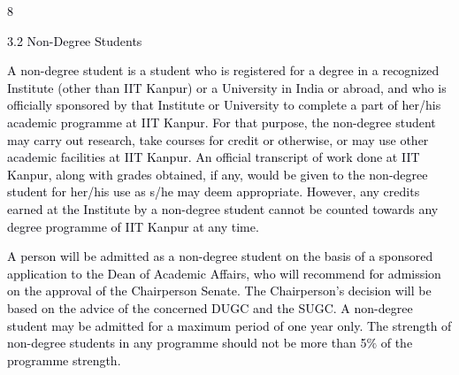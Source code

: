 \documentclass[12pt]{article}
\begin{document}
\vspace{\baselineskip}

\vspace{\baselineskip}

\vspace{\baselineskip}

\vspace{\baselineskip}
\begin{Center}
\textcolor[HTML]{00000A}{8}
\end{Center}\par


\vspace{\baselineskip}
\textcolor[HTML]{00000A}{3.2 Non-Degree Students}\par


\vspace{\baselineskip}
\begin{justify}
{\fontsize{10pt}{12.0pt}\selectfont \textcolor[HTML]{00000A}{A non-degree student is a student who is registered for a degree in a recognized Institute (other than IIT Kanpur) or a University in India or abroad, and who is officially sponsored by that Institute or University to complete a part of her/his academic programme at IIT Kanpur. For that purpose, the non-degree student may carry out research, take courses for credit or otherwise, or may use other academic facilities at IIT Kanpur. An official transcript of work done at IIT Kanpur, along with grades obtained, if any, would be given to the non-degree student for her/his use as s/he may deem appropriate. However, any credits earned at the Institute by a non-degree student cannot be counted towards any degree programme of IIT Kanpur at any time.}\par}
\end{justify}\par


\vspace{\baselineskip}
\begin{justify}
{\fontsize{9pt}{10.8pt}\selectfont \textcolor[HTML]{00000A}{A person will be admitted as a non-degree student on the basis of a sponsored application to the Dean of Academic Affairs, who will recommend for admission on the approval of the Chairperson Senate. The Chairperson's decision will be based on the advice of the concerned DUGC and the SUGC. A non-degree student may be admitted for a maximum period of one year only. The strength of non-degree students in any programme should not be more than 5$\%$  of the programme strength.}\par}
\end{justify}\par
\end{document}
